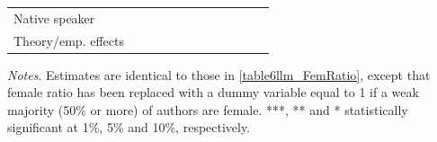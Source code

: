 \begin{table}
\begin{threeparttable}
\begin{tabular}{p{3cm}S@{}S@{}S@{}S@{}S@{}S@{}S@{}S@{}S@{}S@{}S@{}}
            Native speaker                &               &           {}   &               &           {}   &               &           {}   &               &           {}   &               &               &               \\
            Theory/emp. effects           &               &           {}   &               &           {}   &               &           {}   &               &           {}   &               &               &               \\
            \bottomrule
        \end{tabular}
        \begin{tablenotes}
            \tiny
            \item \textit{Notes}. Estimates are identical to those in \autoref{table6llm_FemRatio}, except that female ratio has been replaced with a dummy variable equal to 1 if a weak majority (50\% or more) of authors are female. ***, ** and * statistically significant at 1\%, 5\% and 10\%, respectively.
        \end{tablenotes}
    \end{threeparttable}

\end{table}
